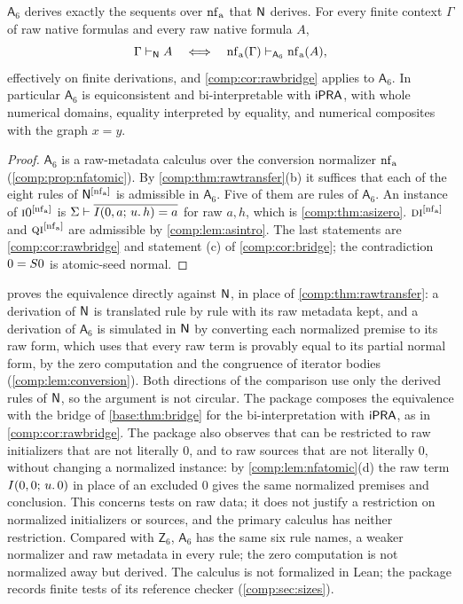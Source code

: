 \begin{theorem}
\label{comp:thm:asix}
$\mathsf{A}_6$ derives exactly the sequents over $\operatorname{nf}_{\mathrm a}$ that $\mathsf{N}$
derives. For every finite context $\Gamma$ of raw native formulas and every
raw native formula $A$,
\[
 \Gamma\vdash_{\mathsf{N}}A
 \quad\Longleftrightarrow\quad
 \operatorname{nf}_{\mathrm a}(\Gamma)\vdash_{\mathsf{A}_6}\operatorname{nf}_{\mathrm a}(A),
\]
effectively on finite derivations, and \cref{comp:cor:rawbridge} applies to
$\mathsf{A}_6$. In particular $\mathsf{A}_6$ is equiconsistent and
bi-interpretable with $\mathsf{iPRA}$, with whole numerical domains, equality
interpreted by equality, and numerical composites with the graph $x=y$.
\end{theorem}

\begin{proof}
$\mathsf{A}_6$ is a raw-metadata calculus over the conversion normalizer
$\operatorname{nf}_{\mathrm a}$ (\cref{comp:prop:nfatomic}). By
\cref{comp:thm:rawtransfer}(b) it suffices that each of the eight rules of
$\mathsf{N}^{[\operatorname{nf}_{\mathrm a}]}$ is admissible in $\mathsf{A}_6$. Five of them are
rules of $\mathsf{A}_6$. An instance of $\rulename{I0}^{[\nf_{\mathrm a}]}$
is $\Sigma\vdash\overline{I(0,a;\,u.\,h)=a}$ for raw $a,h$, which is
\cref{comp:thm:asizero}. $\rulename{DI}^{[\nf_{\mathrm a}]}$ and
$\rulename{QI}^{[\nf_{\mathrm a}]}$ are admissible by \cref{comp:lem:asintro}.
The last statements are \cref{comp:cor:rawbridge} and statement (c) of
\cref{comp:cor:bridge}; the contradiction $0=S0$ is atomic-seed normal.
\end{proof}

\begin{remark}
\label{comp:rem:asix}
 proves the equivalence directly against
$\mathsf{N}$, in place of \cref{comp:thm:rawtransfer}: a derivation of $\mathsf{N}$ is
translated rule by rule with its raw metadata kept, and a derivation of
$\mathsf{A}_6$ is simulated in $\mathsf{N}$ by converting each normalized premise
to its raw form, which uses that every raw term is provably equal to its
partial normal form, by the zero computation and the congruence of iterator
bodies (\cref{comp:lem:conversion}). Both directions of the comparison use
only the derived rules of $\mathsf{N}$, so the argument is not circular. The
package composes the equivalence with the bridge of \cref{base:thm:bridge}
for the bi-interpretation with $\mathsf{iPRA}$, as in \cref{comp:cor:rawbridge}. The
package also observes that  can be restricted to raw
initializers that are not literally $0$, and  to raw sources
that are not literally $0$, without changing a normalized instance: by
\cref{comp:lem:nfatomic}(d) the raw term $I(0,0;\,u.\,0)$ in place of an
excluded $0$ gives the same normalized premises and conclusion. This
concerns tests on raw data; it does not justify a restriction on normalized
initializers or sources, and the primary calculus has neither restriction.
Compared with $\mathsf{Z}_6$, $\mathsf{A}_6$ has the same six rule names, a
weaker normalizer and raw metadata in every rule; the zero computation is
not normalized away but derived. The calculus is not formalized in Lean; the
package records finite tests of its reference checker
(\cref{comp:sec:sizes}).
\end{remark}

